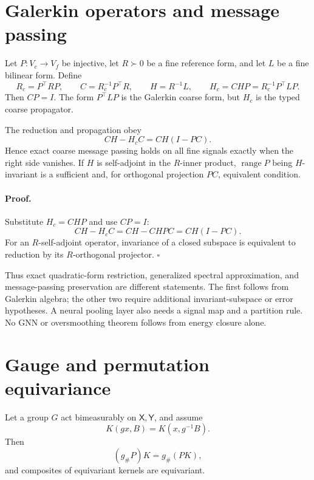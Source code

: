 \section{Galerkin operators and message passing}
\label{sec:cg-galerkin}

Let \(P:V_c\to V_f\) be injective, let \(R\succ0\) be a fine reference form,
and let \(L\) be a fine bilinear form. Define
\begin{equation}
R_c=P^\top RP,\qquad
C=R_c^{-1}P^\top R,\qquad
H=R^{-1}L,\qquad
H_c=CHP=R_c^{-1}P^\top LP.
\label{eq:cg-galerkin-data}
\end{equation}
Then \(CP=I\). The form \(P^\top LP\) is the Galerkin coarse form, but
\(H_c\) is the typed coarse propagator. 

The reduction and propagation obey
\begin{equation}
CH-H_cC=CH(I-PC).
\label{eq:cg-message-residual}
\end{equation}
Hence exact coarse message passing holds on all fine signals exactly when the
right side vanishes. If \(H\) is self-adjoint in the \(R\)-inner product,
\(\operatorname{range}P\) being \(H\)-invariant is a sufficient and, for
orthogonal projection \(PC\), equivalent condition. 

\paragraph{Proof.}
Substitute \(H_c=CHP\) and use \(CP=I\):
\[
CH-H_cC=CH-CHPC=CH(I-PC).
\]
For an \(R\)-self-adjoint operator, invariance of a closed subspace is
equivalent to reduction by its \(R\)-orthogonal projector. \(\square\)

Thus exact quadratic-form restriction, generalized spectral approximation,
and message-passing preservation are different statements. The first follows
from Galerkin algebra; the other two require additional invariant-subspace or
error hypotheses. A neural pooling layer also needs a signal map and a
partition rule. No GNN or oversmoothing theorem follows from energy closure
alone. 

\section{Gauge and permutation equivariance}
\label{sec:cg-equivariance}

Let a group \(G\) act bimeasurably on \(\mathsf X,\mathsf Y\), and assume
\begin{equation}
K(gx,B)=K(x,g^{-1}B).
\label{eq:cg-kernel-equivariance}
\end{equation}
Then
\begin{equation}
(g_\#P)K=g_\#(PK),
\label{eq:cg-law-equivariance}
\end{equation}
and composites of equivariant kernels are equivariant.


